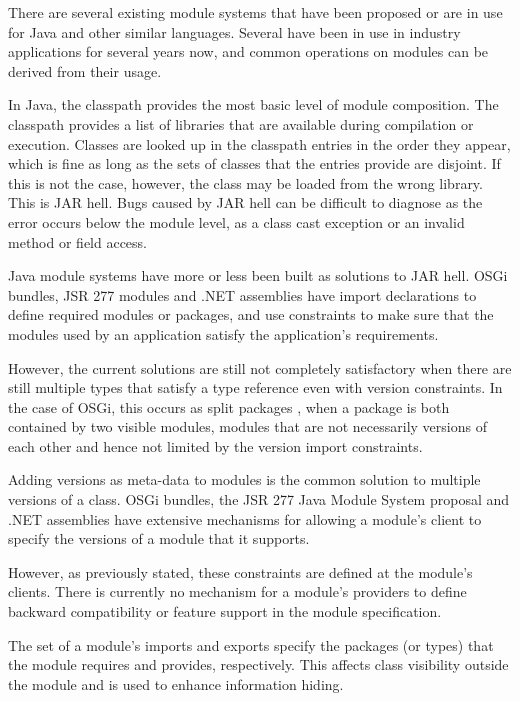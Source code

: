 There are several existing module systems that have been proposed or
are in use for Java and other similar languages. 
Several \cite{javajars, OSGi4, netassemblies} have been in use in industry 
applications for several years now, and common operations on modules
can be derived from their usage. 


In Java, the classpath provides the most basic level of module composition. 
The classpath provides a list of libraries that are
available during compilation or execution. Classes are looked up in the 
classpath entries in the order they appear, which is fine as long as the sets 
of classes that the entries provide are disjoint. If this is not the case, however, the class may
be loaded from the wrong library. This is JAR hell. Bugs caused by JAR hell
can be difficult to diagnose as the error occurs below the module level, as 
a class cast exception or an invalid method or field access.

Java module systems have more or less been built as solutions to JAR hell. 
OSGi \cite{OSGi4} bundles, JSR 277 modules \cite{JSR277} and .NET assemblies \cite{netassemblies}
have import declarations to define required modules or packages, and use constraints 
to make sure that the modules used by an application satisfy the 
application's requirements. 

However, the current solutions are still not completely satisfactory when there are still multiple
types that satisfy a type reference even with version constraints. In the case
of OSGi, this occurs as split packages \cite{iJAMComments}, when a package is both contained by
two visible modules, modules that are not necessarily versions of each other
and hence not limited by the version import constraints.

Adding versions as meta-data to modules is the common solution to multiple
versions of a class. OSGi bundles, the JSR 277 Java Module System
proposal and .NET assemblies have extensive mechanisms for allowing a 
module's client to specify the versions of a module that it supports.

However, as previously stated, these constraints are defined at the module's
clients. There is currently no mechanism for a module's providers to define
backward compatibility or feature support in the module specification.


The set of a module's imports and exports specify the packages (or types) that
the module requires and provides, respectively. This affects class
visibility outside the module and is used to enhance information hiding. 

